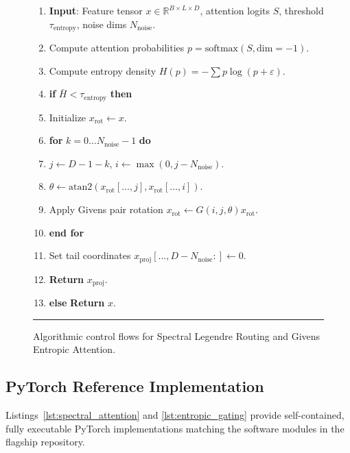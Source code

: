 \documentclass{article}
\begin{document}
\begin{figure}[h]
\begin{minipage}{0.48\textwidth}
\begin{enumerate}[leftmargin=1.2em,label=\arabic*:]
  \item \textbf{Input}: Feature tensor $x \in \mathbb{R}^{B \times L \times D}$, attention logits $S$, threshold $\tau_{\text{entropy}}$, noise dims $N_{\text{noise}}$.
  \item Compute attention probabilities $p = \text{softmax}(S, \text{dim}=-1)$.
  \item Compute entropy density $H(p) = -\sum p \log(p + \varepsilon)$.
  \item \textbf{if} $\bar{H} < \tau_{\text{entropy}}$ \textbf{then}
  \item \quad Initialize $x_{\text{rot}} \gets x$.
  \item \quad \textbf{for} $k = 0 \dots N_{\text{noise}}-1$ \textbf{do}
  \item \qquad $j \gets D - 1 - k$, \quad $i \gets \max(0, j - N_{\text{noise}})$.
  \item \qquad $\theta \gets \text{atan2}(x_{\text{rot}}[..., j], x_{\text{rot}}[..., i])$.
  \item \qquad Apply Givens pair rotation $x_{\text{rot}} \gets G(i, j, \theta) x_{\text{rot}}$.
  \item \quad \textbf{end for}
  \item \quad Set tail coordinates $x_{\text{proj}}[..., D-N_{\text{noise}}:] \gets 0$.
  \item \quad \textbf{Return} $x_{\text{proj}}$.
  \item \textbf{else} \textbf{Return} $x$.
\end{enumerate}
\vspace{4pt} \hrule
\end{minipage}
\caption{Algorithmic control flows for Spectral Legendre Routing and Givens Entropic Attention.}
\label{fig:algorithms}
\end{figure}

\subsection{PyTorch Reference Implementation}
\label{subsec:code_listings}

Listings~\ref{lst:spectral_attention} and \ref{lst:entropic_gating} provide self-contained, fully executable PyTorch implementations matching the software modules in the flagship repository.
\end{document}
